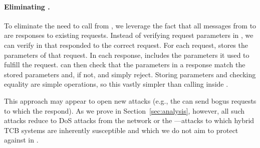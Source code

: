 \paragraph{Eliminating \oauth.}
To eliminate the need to call \oauth from \tcboff, we leverage the fact that all messages from \tcboff to \tcbon are responses to existing requests.
Instead of verifying request parameters in \tcboff, we can verify in \tcbon that \tcboff responded to the correct request.
For each request, \tcbon stores the parameters of that request.
In each response, \tcboff includes the parameters it used to fulfill the request.
\tcbon can then check that the parameters in a response match the stored parameters and, if not,
and simply reject.
Storing parameters and checking equality are simple operations, so this vastly simpler than calling \oauth inside \tcboff.

This approach may appear to open new attacks (e.g., the \medname can send bogus requests to which the \tcboff respond).
As we prove in Section~\ref{sec:analysis}, however, all such attacks reduce to DoS attacks from the network or the \medname---attacks to which hybrid TCB systems are inherently susceptible and which we do not aim to protect against in \tc.


